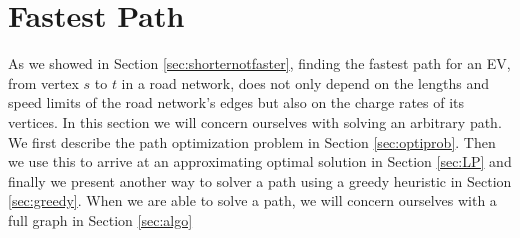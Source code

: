 \section{Fastest Path}
As we showed in Section \ref{sec:shorternotfaster}, finding the fastest path for an EV, from vertex $s$ to $t$ in a road network, does not only depend on the lengths and speed limits of the road network's edges but also on the charge rates of its vertices. In this section we will concern ourselves with solving an arbitrary path. We first describe the path optimization problem in Section \ref{sec:optiprob}. Then we use this to arrive at an approximating optimal solution in Section \ref{sec:LP} and finally we present another way to solver a path using a greedy heuristic in Section \ref{sec:greedy}. When we are able to solve a path, we will concern ourselves with a full graph in Section \ref{sec:algo}